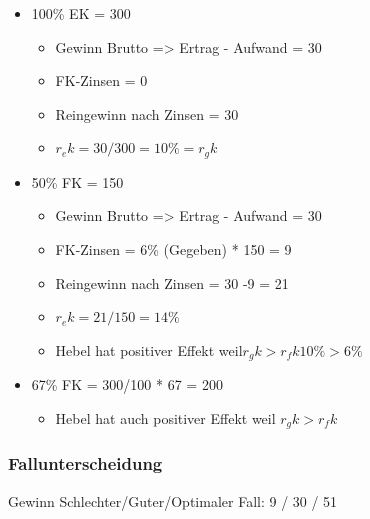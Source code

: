 \begin{itemize}
    \item 100\% EK = 300
    \begin{itemize}
        \item Gewinn Brutto => Ertrag - Aufwand = 30
        \item FK-Zinsen = 0 
        \item Reingewinn nach Zinsen = 30
        \item $r_ek = 30/300 = 10\% = r_gk $
    \end{itemize}
     \item 50\% FK = 150
     \begin{itemize}
         \item Gewinn Brutto => Ertrag - Aufwand = 30
         \item FK-Zinsen = 6\% (Gegeben) * 150 = 9
         \item Reingewinn nach Zinsen = 30 -9 = 21
         \item$ r_ek = 21/150 = 14\%  $
         \item Hebel hat positiver Effekt weil$ r_gk > r_fk  10\% > 6\%$
     \end{itemize}
       \item 67\% FK = 300/100 * 67 = 200
     \begin{itemize}
         \item Hebel hat auch positiver Effekt weil $r_gk > r_fk $
     \end{itemize}
\end{itemize}

\subsubsection{Fallunterscheidung}

Gewinn Schlechter/Guter/Optimaler Fall: 9 / 30 / 51


